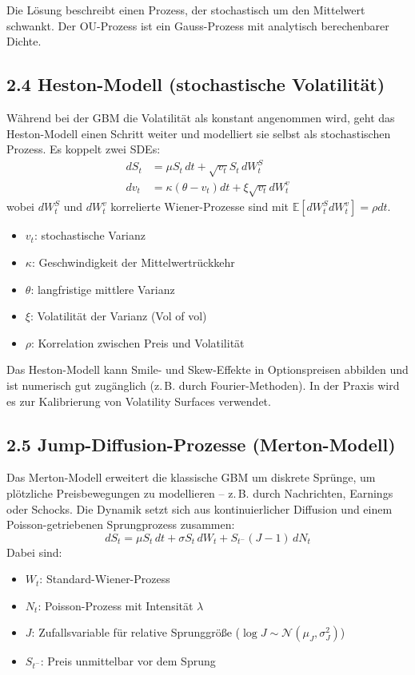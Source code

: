 \documentclass[a4paper,12pt]{article}
\begin{document}
Die Lösung beschreibt einen Prozess, der stochastisch um den Mittelwert schwankt. Der OU-Prozess ist ein Gauss-Prozess mit analytisch berechenbarer Dichte.

\subsection*{2.4 Heston-Modell (stochastische Volatilität)}
Während bei der GBM die Volatilität als konstant angenommen wird, geht das Heston-Modell einen Schritt weiter und modelliert sie selbst als stochastischen Prozess. Es koppelt zwei SDEs:
\[
\begin{aligned}
dS_t &= \mu S_t\,dt + \sqrt{v_t} S_t\,dW_t^S \\
dv_t &= \kappa(\theta - v_t)dt + \xi \sqrt{v_t} dW_t^v
\end{aligned}
\]
wobei \( dW_t^S \) und \( dW_t^v \) korrelierte Wiener-Prozesse sind mit \( \mathbb{E}[dW_t^S dW_t^v] = \rho dt \).

\begin{itemize}
  \item \( v_t \): stochastische Varianz
  \item \( \kappa \): Geschwindigkeit der Mittelwertrückkehr
  \item \( \theta \): langfristige mittlere Varianz
  \item \( \xi \): Volatilität der Varianz (Vol of vol)
  \item \( \rho \): Korrelation zwischen Preis und Volatilität
\end{itemize}

Das Heston-Modell kann Smile- und Skew-Effekte in Optionspreisen abbilden und ist numerisch gut zugänglich (z.\,B. durch Fourier-Methoden). In der Praxis wird es zur Kalibrierung von Volatility Surfaces verwendet.

\clearpage
\subsection*{2.5 Jump-Diffusion-Prozesse (Merton-Modell)}
Das Merton-Modell erweitert die klassische GBM um diskrete Sprünge, um plötzliche Preisbewegungen zu modellieren – z.\,B. durch Nachrichten, Earnings oder Schocks. Die Dynamik setzt sich aus kontinuierlicher Diffusion und einem Poisson-getriebenen Sprungprozess zusammen:
\[
dS_t = \mu S_t\,dt + \sigma S_t\,dW_t + S_{t^-}(J - 1)\,dN_t
\]
Dabei sind:
\begin{itemize}
  \item \( W_t \): Standard-Wiener-Prozess
  \item \( N_t \): Poisson-Prozess mit Intensität \( \lambda \)
  \item \( J \): Zufallsvariable für relative Sprunggröße (\( \log J \sim \mathcal{N}(\mu_J, \sigma_J^2) \))
  \item \( S_{t^-} \): Preis unmittelbar vor dem Sprung
\end{itemize}
\end{document}
